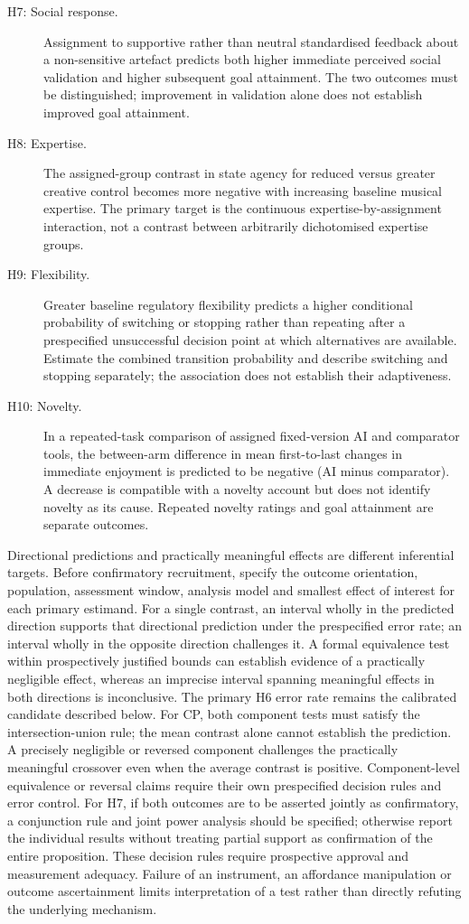 \documentclass[11pt,a4paper]{article}
\begin{document}
\begin{description}
\item[H7: Social response.] Assignment to supportive rather than neutral standardised feedback about a non-sensitive artefact predicts both higher immediate perceived social validation and higher subsequent goal attainment. The two outcomes must be distinguished; improvement in validation alone does not establish improved goal attainment.
\item[H8: Expertise.] The assigned-group contrast in state agency for reduced versus greater creative control becomes more negative with increasing baseline musical expertise. The primary target is the continuous expertise-by-assignment interaction, not a contrast between arbitrarily dichotomised expertise groups.
\item[H9: Flexibility.] Greater baseline regulatory flexibility predicts a higher conditional probability of switching or stopping rather than repeating after a prespecified unsuccessful decision point at which alternatives are available. Estimate the combined transition probability and describe switching and stopping separately; the association does not establish their adaptiveness.
\item[H10: Novelty.] In a repeated-task comparison of assigned fixed-version AI and comparator tools, the between-arm difference in mean first-to-last changes in immediate enjoyment is predicted to be negative (AI minus comparator). A decrease is compatible with a novelty account but does not identify novelty as its cause. Repeated novelty ratings and goal attainment are separate outcomes.
\end{description}

Directional predictions and practically meaningful effects are different inferential targets. Before confirmatory recruitment, specify the outcome orientation, population, assessment window, analysis model and smallest effect of interest for each primary estimand. For a single contrast, an interval wholly in the predicted direction supports that directional prediction under the prespecified error rate; an interval wholly in the opposite direction challenges it. A formal equivalence test within prospectively justified bounds can establish evidence of a practically negligible effect, whereas an imprecise interval spanning meaningful effects in both directions is inconclusive. The primary H6 error rate remains the calibrated candidate described below. For CP, both component tests must satisfy the intersection-union rule; the mean contrast alone cannot establish the prediction. A precisely negligible or reversed component challenges the practically meaningful crossover even when the average contrast is positive. Component-level equivalence or reversal claims require their own prespecified decision rules and error control. For H7, if both outcomes are to be asserted jointly as confirmatory, a conjunction rule and joint power analysis should be specified; otherwise report the individual results without treating partial support as confirmation of the entire proposition. These decision rules require prospective approval and measurement adequacy. Failure of an instrument, an affordance manipulation or outcome ascertainment limits interpretation of a test rather than directly refuting the underlying mechanism.
\end{document}
